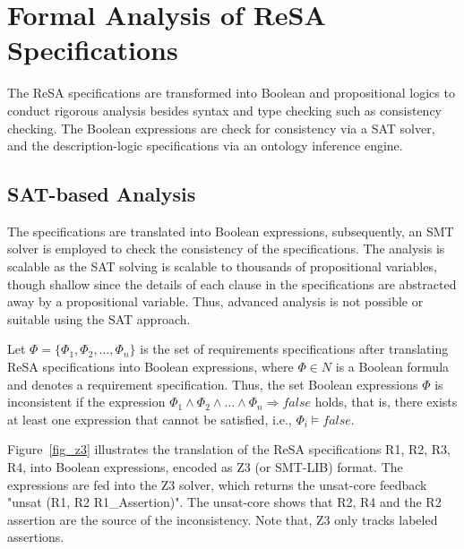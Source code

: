\section{Formal Analysis of ReSA Specifications}\label{rc_resaanalysis}
The ReSA specifications are transformed into Boolean and propositional logics to conduct rigorous analysis besides syntax and type checking such as consistency checking. The Boolean expressions are check for consistency via a SAT solver, and the description-logic specifications via an ontology inference engine. 

\subsection{SAT-based Analysis}
The specifications are translated into Boolean expressions, subsequently, an SMT solver is employed to check the consistency of the specifications. The analysis is scalable as the SAT solving is scalable to thousands of propositional variables, though shallow since the details of each clause in the specifications are abstracted away by a propositional variable. Thus, advanced analysis is not possible or suitable using the SAT approach.%
\begin{definition}
	Let $\Phi = \{\Phi_1, \Phi_2,\dots,\Phi_n\}$ is the set of requirements specifications after translating ReSA specifications into Boolean expressions, where  $\Phi\in N$ is a Boolean formula and denotes a requirement specification. Thus, the set Boolean expressions $\Phi$ is inconsistent if the expression $\Phi_1 \land \Phi_2 \land\dots\land \Phi_n \Rightarrow false$ holds, that is, there exists at least one expression that cannot be satisfied, i.e., $\Phi_i\models false$.
\end{definition}
\begin{example}
Figure~\ref{fig_z3} illustrates the translation of the ReSA specifications R1, R2, R3, R4, into Boolean expressions, encoded as Z3 (or SMT-LIB) format. %
The expressions are fed into the Z3 solver, which returns the unsat-core feedback "unsat (R1, R2 R1\_Assertion)". The unsat-core shows that R2, R4 and the R2 assertion are the source of the inconsistency. Note that, Z3 only tracks labeled assertions.
\end{example}
